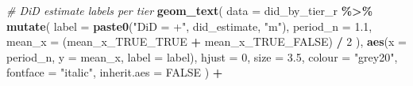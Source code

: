 \documentclass[
]{article}
\newenvironment{Shaded}{\begin{snugshade}}{\end{snugshade}}
\newcommand{\AttributeTok}[1]{\textcolor[rgb]{0.13,0.29,0.53}{#1}}
\newcommand{\CommentTok}[1]{\textcolor[rgb]{0.56,0.35,0.01}{\textit{#1}}}
\newcommand{\ConstantTok}[1]{\textcolor[rgb]{0.56,0.35,0.01}{#1}}
\newcommand{\DecValTok}[1]{\textcolor[rgb]{0.00,0.00,0.81}{#1}}
\newcommand{\FloatTok}[1]{\textcolor[rgb]{0.00,0.00,0.81}{#1}}
\newcommand{\FunctionTok}[1]{\textcolor[rgb]{0.13,0.29,0.53}{\textbf{#1}}}
\newcommand{\NormalTok}[1]{#1}
\newcommand{\SpecialCharTok}[1]{\textcolor[rgb]{0.81,0.36,0.00}{\textbf{#1}}}
\newcommand{\StringTok}[1]{\textcolor[rgb]{0.31,0.60,0.02}{#1}}
\begin{document}
\begin{Shaded}
\begin{Highlighting}[]
  \CommentTok{\# DiD estimate labels per tier}
  \FunctionTok{geom\_text}\NormalTok{(}
    \AttributeTok{data =}\NormalTok{ did\_by\_tier\_r }\SpecialCharTok{\%\textgreater{}\%}
      \FunctionTok{mutate}\NormalTok{(}
        \AttributeTok{label    =} \FunctionTok{paste0}\NormalTok{(}\StringTok{"DiD = +"}\NormalTok{, did\_estimate, }\StringTok{"m"}\NormalTok{),}
        \AttributeTok{period\_n =} \FloatTok{1.1}\NormalTok{,}
        \AttributeTok{mean\_x   =}\NormalTok{ (mean\_x\_TRUE\_TRUE }\SpecialCharTok{+}\NormalTok{ mean\_x\_TRUE\_FALSE) }\SpecialCharTok{/} \DecValTok{2}
\NormalTok{      ),}
    \FunctionTok{aes}\NormalTok{(}\AttributeTok{x =}\NormalTok{ period\_n, }\AttributeTok{y =}\NormalTok{ mean\_x, }\AttributeTok{label =}\NormalTok{ label),}
    \AttributeTok{hjust =} \DecValTok{0}\NormalTok{, }\AttributeTok{size =} \FloatTok{3.5}\NormalTok{,}
    \AttributeTok{colour =} \StringTok{"grey20"}\NormalTok{, }\AttributeTok{fontface =} \StringTok{"italic"}\NormalTok{,}
    \AttributeTok{inherit.aes =} \ConstantTok{FALSE}
\NormalTok{  ) }\SpecialCharTok{+}


\end{Highlighting}
\end{Shaded}
\end{document}
